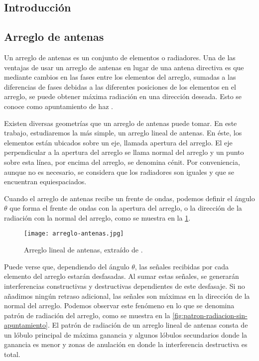 \documentclass{article}
\newenvironment{standalone}{\begin{preview}}{\end{preview}}
\begin{document}
\begin{standalone}
  \section{Introducción}

  \subsection{Arreglo de antenas} \label{subsec:arreglo}

  Un arreglo de antenas es un conjunto de elementos o radiadores.
  Una de las ventajas de usar un arreglo de antenas en lugar de una antena directiva es que mediante cambios en las fases entre los elementos del arreglo, sumadas a las diferencias de fases debidas a las diferentes posiciones de los elementos en el arreglo, se puede obtener máxima radiación en una dirección deseada.
  Esto se conoce como apuntamiento de haz \cite{visser2005}.

  Existen diversas geometrías que un arreglo de antenas puede tomar.
  En este trabajo, estudiaremos la más simple, un arreglo lineal de antenas.
  En éste, los elementos están ubicados sobre un eje, llamada apertura del arreglo.
  El eje perpendicular a la apertura del arreglo se llama normal del arreglo y un punto sobre esta línea, por encima del arreglo, se denomina cénit.
  Por conveniencia, aunque no es necesario, se considera que los radiadores son iguales y que se encuentran equiespaciados.

  Cuando el arreglo de antenas recibe un frente de ondas, podemos definir el ángulo $\theta$ que forma el frente de ondas con la apertura del arreglo, o la dirección de la radiación con la normal del arreglo, como se muestra en la \cref{fig:arreglo-antenas}.

  \begin{figure}[!htbp]
    \centering
    \texttt{[image: arreglo-antenas.jpg]}
    \caption{Arreglo lineal de antenas, extraído de \cite{visser2005}.}
    \label{fig:arreglo-antenas}
  \end{figure}

  Puede verse que, dependiendo del ángulo $\theta$, las señales recibidas por cada elemento del arreglo estarán desfasadas.
  Al sumar estas señales, se generarán interferencias constructivas y destructivas dependientes de este desfasaje.
  Si no añadimos ningún retraso adicional, las señales son máximas en la dirección de la normal del arreglo.
  Podemos observar este fenómeno en lo que se denomina patrón de radiación del arreglo, como se muestra en la \cref{fig:patron-radiacion-sin-apuntamiento}.
  El patrón de radiación de un arreglo lineal de antenas consta de un lóbulo principal de máxima ganancia y algunos lóbulos secundarios donde la ganancia es menor y zonas de anulación en donde la interferencia destructiva es total.


\end{standalone}
\end{document}
